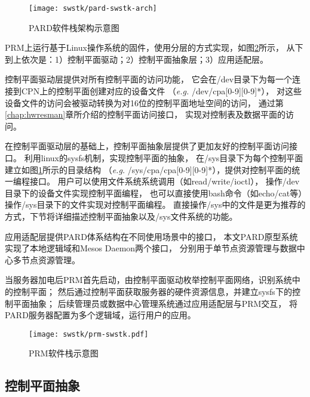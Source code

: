 \begin{figure}[tb]
  \centering
  \texttt{[image: swstk/pard-swstk-arch]}
  \caption{PARD软件栈架构示意图}
  \label{fig:pard-swstk-arch}
\end{figure}


PRM上运行基于Linux操作系统的固件，使用分层的方式实现，如图\ref{fig:prm-swstk}所示，
从下到上依次是：1）控制平面驱动；2）控制平面抽象层；3）应用适配层。

控制平面驱动层提供对所有控制平面的访问功能，
它会在/dev目录下为每一个连接到CPN上的控制平面创建对应的设备文件
（\textit{e.g.} /dev/cpa[0-9][0-9]*），
对这些设备文件的访问会被驱动转换为对16位的控制平面地址空间的访问，
通过第\ref{chap:hwresman}章所介绍的控制平面访问接口，
实现对控制表及数据平面的访问。

在控制平面驱动层的基础上，控制平面抽象层提供了更加友好的控制平面访问接口。
利用linux的sysfs\cite{patrick_mochel_sysfs_2005}机制，实现控制平面的抽象，
在/sys目录下为每个控制平面建立如图\ref{fig:pard-swstk-arch}所示的目录结构
（\textit{e.g.} /sys/cpa/cpa[0-9][0-9]*），提供对控制平面的统一编程接口。
用户可以使用文件系统系统调用（如read/write/ioctl），
操作/dev目录下的设备文件实现控制平面编程，
也可以直接使用bash命令（如echo/cat等）操作/sys目录下的文件实现对控制平面编程。
直接操作/sys中的文件是更为推荐的方式，下节将详细描述控制平面抽象以及/sys文件系统的功能。

应用适配层提供PARD体系结构在不同使用场景中的接口，
本文PARD原型系统实现了本地逻辑域和Mesos Daemon两个接口，
分别用于单节点资源管理与数据中心多节点资源管理。

当服务器加电后PRM首先启动，由控制平面驱动枚举控制平面网络，识别系统中的控制平面；
然后通过控制平面获取服务器的硬件资源信息，并建立sysfs下的控制平面抽象；
后续管理员或数据中心管理系统通过应用适配层与PRM交互，
将PARD服务器配置为多个逻辑域，运行用户的应用。


\begin{figure}[tb]
  \centering
  \texttt{[image: swstk/prm-swstk.pdf]}
  \caption[PRM软件栈示意图]{PRM软件栈示意图}
  \label{fig:prm-swstk}
\end{figure}


\subsection{控制平面抽象}
\label{chap:prm:arch:cpabs}

